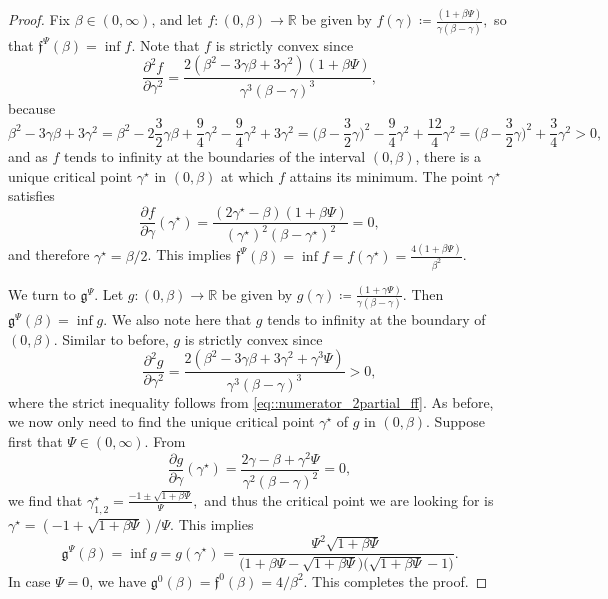 \documentclass[10pt]{article} %
\newcommand\ff{\mathfrak f}
\newcommand\fg{\mathfrak g}
\def \R{\mathbb{R}}
\newcommand{\1}{\mathbf{1}}
\begin{document}
\begin{proof}
	Fix $\beta \in (0,\infty)$, and let $f : (0,\beta) \rightarrow \R$ be given by $f(\gamma) \coloneqq \frac{(1+\beta\Psi)}{\gamma(\beta-\gamma)},$ so that $\ff^\Psi(\beta) = \inf f$. Note that $f$ is strictly convex since 
	\begin{equation*}
		\frac{\partial^2 f}{\partial \gamma^2} = \frac{2(\beta^2 - 3\gamma\beta + 3 \gamma^2)(1+\beta\Psi)}{\gamma^3(\beta-\gamma)^3},
	\end{equation*}
	because
	\begin{equation}\label{eq::numerator_2partial_ff}
		\beta^2-3\gamma\beta + 3\gamma^2 = \beta^2 - 2 \frac{3}{2}\gamma \beta + \frac{9}{4}\gamma^2 - \frac{9}{4}\gamma^2 + 3\gamma^2 = \bigg(\beta - \frac{3}{2}\gamma\bigg)^2 - \frac{9}{4}\gamma^2 + \frac{12}{4}\gamma^2 = \bigg(\beta - \frac{3}{2}\gamma\bigg)^2 + \frac{3}{4}\gamma^2 > 0,
	\end{equation}
	and as $f$ tends to infinity at the boundaries of the interval $(0,\beta)$, there is a unique critical point $\gamma^\star$ in $(0,\beta)$ at which $f$ attains its minimum. The point $\gamma^\star$ satisfies
	\begin{equation*}
		\frac{\partial f}{\partial \gamma} (\gamma^\star) = \frac{(2\gamma^\star- \beta)(1+\beta\Psi)}{(\gamma^\star)^2(\beta-\gamma^\star)^2} = 0,
	\end{equation*}
	and therefore $\gamma^\star = \beta/2$. This implies $\ff^\Psi(\beta) = \inf f = f(\gamma^\star) = \frac{4(1+\beta\Psi)}{\beta^2}$. 
	
	\medskip
	We turn to $\fg^\Psi$. Let $g : (0,\beta) \longrightarrow \R$ be given by $g(\gamma) \coloneqq \frac{(1+\gamma\Psi)}{\gamma(\beta-\gamma)}.$ Then $\fg^\Psi(\beta) = \inf g$. We also note here that $g$ tends to infinity at the boundary of $(0,\beta)$. Similar to before, $g$ is strictly convex since
	\begin{equation*}
		\frac{\partial^2 g}{\partial \gamma^2} = \frac{2(\beta^2-3\gamma\beta + 3\gamma^2 + \gamma^3\Psi)}{\gamma^3(\beta-\gamma)^3} > 0,
	\end{equation*}
	where the strict inequality follows from \eqref{eq::numerator_2partial_ff}. As before, we now only need to find the unique critical point $\gamma^\star$ of $g$ in $(0,\beta)$. Suppose first that $\Psi \in (0,\infty)$. From
	\begin{equation*}
		\frac{\partial g}{\partial \gamma}(\gamma^\star) = \frac{2\gamma - \beta + \gamma^2\Psi}{\gamma^2(\beta-\gamma)^2} = 0,
	\end{equation*}
	we find that $\gamma^\star_{1,2} = \frac{-1 \pm \sqrt{1+\beta\Psi}}{\Psi},$ and thus the critical point we are looking for is $\gamma^\star = (-1 +\sqrt{1+\beta\Psi})/\Psi$. This implies
	\begin{equation*}
		\fg^\Psi(\beta) = \inf g = g(\gamma^\star) = \frac{\Psi^2  \sqrt{1+\beta\Psi}}{\big(1+\beta\Psi -\sqrt{1+\beta\Psi}\big)\big(\sqrt{1+\beta\Psi}-1\big)}.
	\end{equation*}
	In case $\Psi = 0$, we have $\fg^0(\beta) = \ff^0(\beta) = 4/\beta^2$. This completes the proof.
\end{proof}
\end{document}

